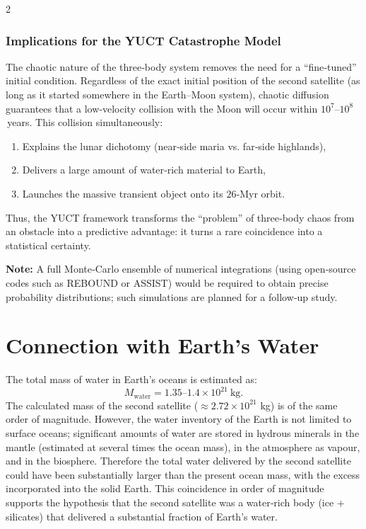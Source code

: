 \documentclass[11pt,a4paper]{article}
\begin{document}
\begin{multicols}{2}
		\subsubsection{Implications for the YUCT Catastrophe Model}
		
		The chaotic nature of the three‑body system removes the need for a 
		“fine‑tuned” initial condition.  Regardless of the exact initial position 
		of the second satellite (as long as it started somewhere in the Earth–Moon 
		system), chaotic diffusion guarantees that a low‑velocity collision with 
		the Moon will occur within \(10^{7}\)–\(10^{8}\) years.  This collision 
		simultaneously:
		
		\begin{enumerate}
			\item Explains the lunar dichotomy (near‑side maria vs. far‑side highlands),
			\item Delivers a large amount of water‑rich material to Earth,
			\item Launches the massive transient object onto its \(26\)‑Myr orbit.
		\end{enumerate}
		
		Thus, the YUCT framework transforms the “problem” of three‑body chaos 
		from an obstacle into a predictive advantage: it turns a rare coincidence 
		into a statistical certainty.
		
		\vspace{0.2cm}
		\noindent
		\textbf{Note:} A full Monte‑Carlo ensemble of numerical integrations 
		(using open‑source codes such as REBOUND or ASSIST) would be required 
		to obtain precise probability distributions; such simulations are 
		planned for a follow‑up study.
		
		
		\section{Connection with Earth's Water}
		
		The total mass of water in Earth's oceans is estimated as:
		\[
		M_{\text{water}} = 1.35\text{–}1.4 \times 10^{21}\ \text{kg}.
		\]
		The calculated mass of the second satellite (\(\approx 2.72 \times 10^{21}\) kg) is of the same order of magnitude. However, the water inventory of the Earth is not limited to surface oceans; significant amounts of water are stored in hydrous minerals in the mantle (estimated at several times the ocean mass), in the atmosphere as vapour, and in the biosphere. Therefore the total water delivered by the second satellite could have been substantially larger than the present ocean mass, with the excess incorporated into the solid Earth. This coincidence in order of magnitude supports the hypothesis that the second satellite was a water‑rich body (ice + silicates) that delivered a substantial fraction of Earth's water.
		

\end{multicols}
\end{document}
